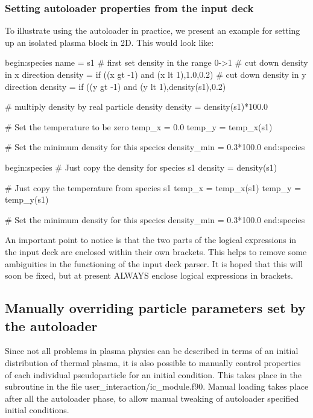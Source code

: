 \subsubsection{Setting autoloader properties from the input deck}
To illustrate using the autoloader in practice, we present an example for
setting up an isolated plasma block in 2D. This would look like:
\begin{boxverbatim}
begin:species
   name = s1
   # first set density in the range 0->1
   # cut down density in x direction
   density = if ((x gt -1) and (x lt 1),1.0,0.2)
   # cut down density in y direction
   density = if ((y gt -1) and (y lt 1),density(s1),0.2)

   # multiply density by real particle density
   density = density(s1)*100.0

   # Set the temperature to be zero
   temp_x = 0.0
   temp_y = temp_x(s1)

   # Set the minimum density for this species
   density_min = 0.3*100.0
end:species

begin:species
   # Just copy the density for species s1
   density = density(s1)

   # Just copy the temperature from species s1
   temp_x = temp_x(s1)
   temp_y = temp_y(s1)

   # Set the minimum density for this species
   density_min = 0.3*100.0
end:species
\end{boxverbatim}

An important point to notice is that the two parts of the logical expressions
in the input deck are enclosed within their own brackets. This helps to remove
some ambiguities in the functioning of the input deck parser. It is hoped that
this will soon be fixed, but at present ALWAYS enclose logical expressions in
brackets.


\subsection{Manually overriding particle parameters set by the autoloader}
\label{sec:manualload}

Since not all problems in plasma physics can be described in terms of an
initial distribution of thermal plasma, it is also possible to manually
control properties of each individual pseudoparticle for an initial
condition. This takes place in the subroutine  in the
file user\_interaction/ic\_module.f90. Manual loading takes place after
all the autoloader phase, to allow manual tweaking of autoloader specified
initial conditions.

